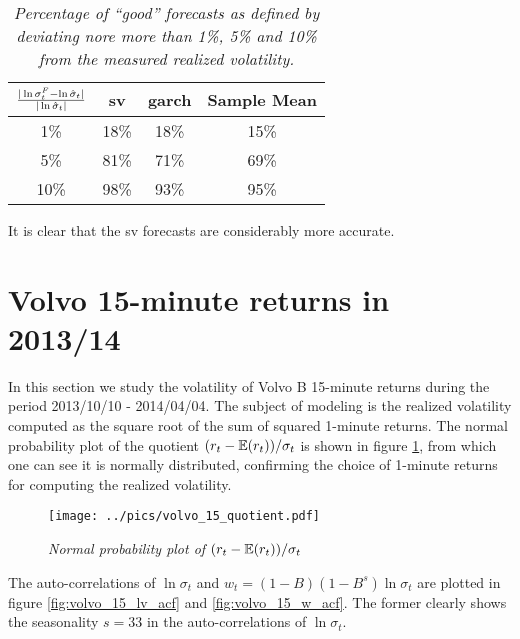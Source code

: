 \begin{table}[htb!]
  \centering
  \begin{tabular}{|c|c|c|c|}
    \hline
    ${|\ln \sigma^F_t - \ln \hat{\sigma}_t| \over |\ln
      \hat{\sigma}_t|}$ &
    \gls{sv} & \gls{garch} & Sample Mean \\
    \hline
    1\% & 18\% & 18\% & 15\% \\
    \hline
    5\% & 81\% & 71\% & 69\% \\
    \hline
    10\% & 98\% & 93\% & 95\% \\
    \hline
  \end{tabular}
  \caption{\small \it Percentage of ``good'' forecasts as defined by
    deviating nore more than 1\%, 5\% and 10\% from the measured
    realized volatility.}
  \label{tab:nordea3_diff_2}
\end{table}
It is clear that the \gls{sv} forecasts are considerably more accurate.

\section{Volvo 15-minute returns in 2013/14}
\label{sec:volvo}
In this section we study the volatility of Volvo B 15-minute returns
during the period 2013/10/10 - 2014/04/04.
The subject of modeling is the realized volatility
computed as the square root of the sum of squared 1-minute
returns. The normal probability plot of the quotient $(r_t -
\mathbb{E}(r_t))/\sigma_t$ is shown in figure \ref{fig:volvo_15_quotient},
from which one can see it is normally distributed, confirming the
choice of 1-minute returns for computing the realized volatility.
\begin{figure}[htb!]
  \centering
  \texttt{[image: ../pics/volvo\_15\_quotient.pdf]}
  \caption{\small \it Normal probability plot of $(r_t -
    \mathbb{E}(r_t))/\sigma_t$}
  \label{fig:volvo_15_quotient}
\end{figure}
The auto-correlations of $\ln \sigma_t$ and $w_t = (1-B)(1-B^s) \ln
\sigma_t$ are plotted in figure \ref{fig:volvo_15_lv_acf} and
\ref{fig:volvo_15_w_acf}. The former clearly shows the seasonality
$s = 33$ in the auto-correlations of $\ln \sigma_t$.

